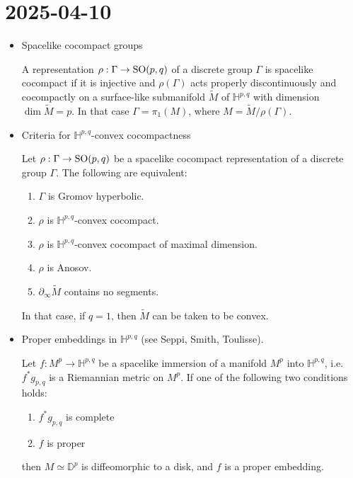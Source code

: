 \documentclass{report}
\begin{document}
\section{2025-04-10}
\begin{itemize}
    \item Spacelike cocompact groups
    \begin{definition}
        A representation $\rho: \Gamma \to \operatorname{{\mathrm{SO}}}(p,q)$ of a discrete group $\Gamma$ is spacelike cocompact if it is injective and $\rho(\Gamma)$ acts properly discontinuously and cocompactly on a surface-like submanifold $\tilde M$ of $\mathbb H^{p,q}$ with dimension $\dim \tilde M = p$.
        In that case $\Gamma = \pi_1(M)$, where $M = \tilde M / \rho(\Gamma)$.
    \end{definition}
    \item Criteria for $\mathbb H^{p,q}$-convex cocompactness
    \begin{lemma}
        Let $\rho: \Gamma \to \operatorname{{\mathrm{SO}}}(p,q)$ be a spacelike cocompact representation of a discrete group $\Gamma$.
        The following are equivalent:
        \begin{enumerate}[label=(\roman*)]
            \item $\Gamma$ is Gromov hyperbolic.
            \item $\rho$ is $\mathbb H^{p,q}$-convex cocompact.
            \item $\rho$ is $\mathbb H^{p,q}$-convex cocompact of maximal dimension.
            \item $\rho$ is Anosov.
            \item $\partial_\infty \tilde M$ contains no segments.
        \end{enumerate}
        In that case, if $q=1$, then $\tilde M$ can be taken to be convex.
    \end{lemma}
    \item Proper embeddings in $\mathbb H^{p,q}$ (see Seppi, Smith, Toulisse).
    \begin{lemma}
        Let $f: M^p \to \mathbb H^{p,q}$ be a spacelike immersion of a manifold $M^p$ into $\mathbb H^{p,q}$, i.e.\ $f^* g_{p,q}$ is a Riemannian metric on $M^p$.
        If one of the following two conditions holds:
        \begin{enumerate}[label=(\roman*)]
            \item $f^* g_{p,q}$ is complete
            \item $f$ is proper
        \end{enumerate}
        then $M \simeq \mathbb D^p$ is diffeomorphic to a disk, and $f$ is a proper embedding.

\end{lemma}
\end{itemize}
\end{document}
